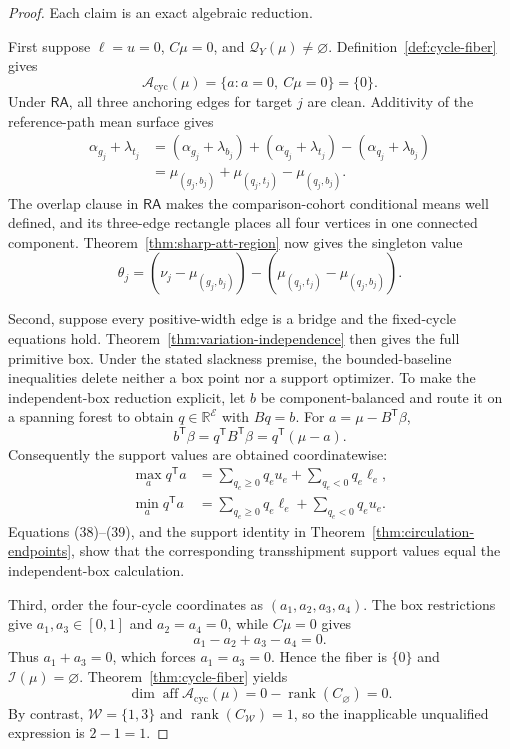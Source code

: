 \documentclass{article}
\begin{document}
\begin{proof}
Each claim is an exact algebraic reduction.

First suppose \(\ell=u=0\), \(C\mu=0\), and \(\mathcal Q_Y(\mu)\ne\varnothing\).  Definition~\ref{def:cycle-fiber} gives
\[
 \mathcal A_{\mathrm{cyc}}(\mu)
 =\{a:a=0,\ C\mu=0\}=\{0\}.
\tag{35}
\]
Under \(\mathsf{RA}\), all three anchoring edges for target \(j\) are clean.  Additivity of the reference-path mean surface gives
\[
 \begin{aligned}
 \alpha_{g_j}+\lambda_{t_j}
 &=(\alpha_{g_j}+\lambda_{b_j})
   +(\alpha_{q_j}+\lambda_{t_j})
   -(\alpha_{q_j}+\lambda_{b_j})\\
 &=\mu_{(g_j,b_j)}+\mu_{(q_j,t_j)}-\mu_{(q_j,b_j)}.
 \end{aligned}
\tag{36}
\]
The overlap clause in \(\mathsf{RA}\) makes the comparison-cohort conditional means well defined, and its three-edge rectangle places all four vertices in one connected component.  Theorem~\ref{thm:sharp-att-region} now gives the singleton value
\[
 \theta_j=(\nu_j-\mu_{(g_j,b_j)})
 -(\mu_{(q_j,t_j)}-\mu_{(q_j,b_j)}).
\tag{37}
\]

Second, suppose every positive-width edge is a bridge and the fixed-cycle equations hold.  Theorem~\ref{thm:variation-independence} then gives the full primitive box.  Under the stated slackness premise, the bounded-baseline inequalities delete neither a box point nor a support optimizer.  To make the independent-box reduction explicit, let \(b\) be component-balanced and route it on a spanning forest to obtain \(q\in\mathbb R^{\mathcal E}\) with \(Bq=b\).  For \(a=\mu-B^{\mathsf T}\beta\),
\[
 b^{\mathsf T}\beta
 =q^{\mathsf T}B^{\mathsf T}\beta
 =q^{\mathsf T}(\mu-a).
\tag{38}
\]
Consequently the support values are obtained coordinatewise:
\[
 \begin{aligned}
 \max_a q^{\mathsf T}a
 &=\sum_{q_e\ge0}q_eu_e+\sum_{q_e<0}q_e\ell_e,\\
 \min_a q^{\mathsf T}a
 &=\sum_{q_e\ge0}q_e\ell_e+\sum_{q_e<0}q_eu_e.
 \end{aligned}
\tag{39}
\]
Equations (38)--(39), and the support identity in Theorem~\ref{thm:circulation-endpoints}, show that the corresponding transshipment support values equal the independent-box calculation.

Third, order the four-cycle coordinates as \((a_1,a_2,a_3,a_4)\).  The box restrictions give \(a_1,a_3\in[0,1]\) and \(a_2=a_4=0\), while \(C\mu=0\) gives
\[
 a_1-a_2+a_3-a_4=0.
\]
Thus \(a_1+a_3=0\), which forces \(a_1=a_3=0\).  Hence the fiber is \(\{0\}\) and \(\mathcal I(\mu)=\varnothing\).  Theorem~\ref{thm:cycle-fiber} yields
\[
 \dim\operatorname{aff}\mathcal A_{\mathrm{cyc}}(\mu)
 =0-\operatorname{rank}(C_{\varnothing})=0.
\tag{40}
\]
By contrast, \(\mathcal W=\{1,3\}\) and \(\operatorname{rank}(C_{\mathcal W})=1\), so the inapplicable unqualified expression is \(2-1=1\).


\end{proof}
\end{document}
